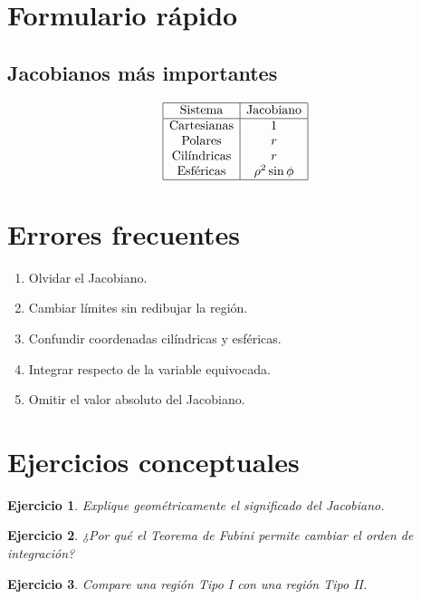 \documentclass[12pt,spanish]{article}
\newtheorem{ejercicio}{Ejercicio}[section]
\begin{document}
\section{Formulario rápido}

\subsection{Jacobianos más importantes}

\[
\begin{array}{|c|c|}
\hline
\text{Sistema} & \text{Jacobiano} \\
\hline
\text{Cartesianas} & 1 \\
\text{Polares} & r \\
\text{Cilíndricas} & r \\
\text{Esféricas} & \rho^2\sin\phi \\
\hline
\end{array}
\]

\section{Errores frecuentes}

\begin{enumerate}
\item Olvidar el Jacobiano.
\item Cambiar límites sin redibujar la región.
\item Confundir coordenadas cilíndricas y esféricas.
\item Integrar respecto de la variable equivocada.
\item Omitir el valor absoluto del Jacobiano.
\end{enumerate}

\section{Ejercicios conceptuales}

\begin{ejercicio}
Explique geométricamente el significado del Jacobiano.
\end{ejercicio}

\begin{ejercicio}
¿Por qué el Teorema de Fubini permite cambiar el orden de integración?
\end{ejercicio}

\begin{ejercicio}
Compare una región Tipo I con una región Tipo II.
\end{ejercicio}
\end{document}

